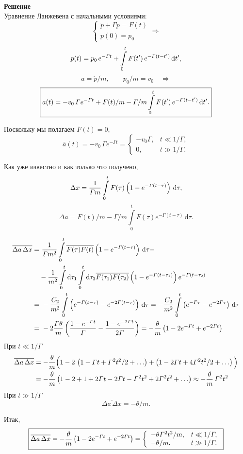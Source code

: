 \documentclass[a4paper, 12pt]{article}
\let\Gamma\varGamma
\let\intorig\int
\def\int{\intorig\limits}
\def\d{\,\mathrm{d}}
\begin{document}
\noindent\textbf{\large Решение}\\
Уравнение Ланжевена с начальными условиями:
$$ 
\left\{
\begin{array}{l}
\dot{p} + \Gamma p = F(t) \\
p(0) = p_0
\end{array}
\right.
\Rightarrow$$ 
$$ p(t) = p_0\, e^{-\Gamma t} + \int\limits_0^t F(t')\, e^{-\Gamma(t-t')} \d t',$$
$$ a = \dot{p}/m, \qquad p_0/m = v_0 \quad \Rightarrow $$
$$\boxed{ a(t) = -v_0\,\Gamma e^{-\Gamma t} + F(t)/m - \Gamma/m\int\limits_0^t F(t')\, e^{-\Gamma(t-t')}\d t'. }$$

Поскольку мы полагаем $\overline{F}(t) = 0$, 
$$\boxed{
\bar{a}(t) = -v_0\,\Gamma e^{-\Gamma t} = 
\left\{
\begin{array}{ll}
-v_0\Gamma, & t \ll 1/\Gamma, \\
0, & t \gg 1/\Gamma. 
\end{array}
\right.
}$$

Как уже известно и как только что получено, 
$$ \Delta x = {1 \over \Gamma m} \int_0^t F(\tau) \left(1 - e^{-\Gamma(t-\tau)}\right)\d\tau, $$
$$ \Delta a = F(t)/m - \Gamma/m \int_0^t F(\tau)e^{-\Gamma(t-\tau)}\d\tau. $$

$$ \begin{aligned}
\overline{\Delta a\, \Delta x} =&\  
{1 \over \Gamma m^2} \int_0^t \overline{F(\tau)F(t)} \left(1 - e^{-\Gamma(t-\tau)}\right)\d\tau - \\
&-
{1 \over m^2} \int_0^t\!\d\tau_1 \int_0^t\!\d\tau_2
\overline{F(\tau_1)F(\tau_2)} 
\left(1 -e^{-\Gamma(t-\tau_1)}\right)
e^{-\Gamma(t-\tau_2)}
\\=&\ -{C_2 \over m^2} \int_0^t \left(e^{-\Gamma(t-\tau)} - e^{-2\Gamma(t-\tau)} \right)\d\tau
= -{C_2 \over m^2} \int_0^t \left(e^{-\Gamma\tau} - e^{-2\Gamma\tau} \right)\d\tau
\\=&\ -2{\Gamma\theta \over m} \left( 
\frac{1 - e^{-\Gamma t}}{\Gamma} - \frac{1 - e^{-2\Gamma t}}{2\Gamma} 
\right) =
-\frac{\theta}{m} \left(1 - 2e^{-\Gamma t} + e^{-2\Gamma t}\right) 
\end{aligned}$$
При $t \ll 1/\Gamma$
$$\begin{aligned}
\overline{\Delta a\, \Delta x} &= -{\theta \over m}\Big(
1 - 2\,\left(1 - \Gamma t + \Gamma^2 t^2/2 +\ldots\right) + \left(1 - 2\Gamma t + 4\Gamma^2t^2/2 + \ldots \right)
\Big) 
\\&= -{\theta \over m} \left(
1 - 2 + 1 + 2\Gamma t - 2\Gamma t - \Gamma^2 t^2 + 2\Gamma^2t^2 + \ldots
\right)
\approx -{\theta \over m}\,\Gamma^2t^2
\end{aligned}$$
При $t \gg 1/\Gamma$ 
$$ \overline{\Delta a\,\Delta x} = -\theta/m. $$

Итак, 
$$ \boxed{
\overline{\Delta a\, \Delta x} = -{\theta \over m} \left(1 - 2e^{-\Gamma t} + e^{-2\Gamma t}\right)
= \left\{
\begin{array}{ll}
-\theta\Gamma^2t^2/m, & t \ll 1/\Gamma, \\
-\theta/m, & t \gg 1/\Gamma.
\end{array}\right.
}$$
\end{document}
